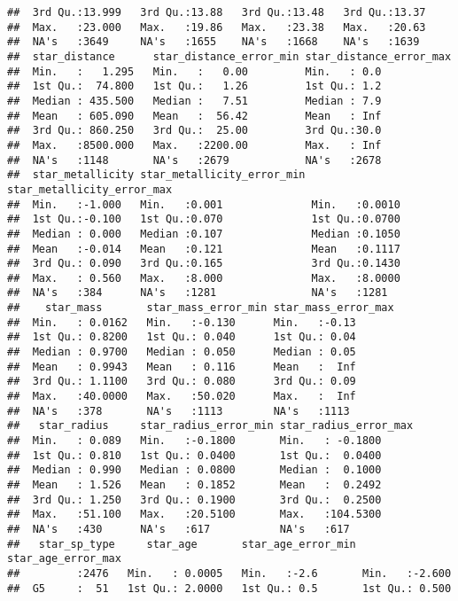 \documentclass[]{article}
\begin{document}
\begin{verbatim}
##  3rd Qu.:13.999   3rd Qu.:13.88   3rd Qu.:13.48   3rd Qu.:13.37  
##  Max.   :23.000   Max.   :19.86   Max.   :23.38   Max.   :20.63  
##  NA's   :3649     NA's   :1655    NA's   :1668    NA's   :1639   
##  star_distance      star_distance_error_min star_distance_error_max
##  Min.   :   1.295   Min.   :   0.00         Min.   : 0.0           
##  1st Qu.:  74.800   1st Qu.:   1.26         1st Qu.: 1.2           
##  Median : 435.500   Median :   7.51         Median : 7.9           
##  Mean   : 605.090   Mean   :  56.42         Mean   : Inf           
##  3rd Qu.: 860.250   3rd Qu.:  25.00         3rd Qu.:30.0           
##  Max.   :8500.000   Max.   :2200.00         Max.   : Inf           
##  NA's   :1148       NA's   :2679            NA's   :2678           
##  star_metallicity star_metallicity_error_min star_metallicity_error_max
##  Min.   :-1.000   Min.   :0.001              Min.   :0.0010            
##  1st Qu.:-0.100   1st Qu.:0.070              1st Qu.:0.0700            
##  Median : 0.000   Median :0.107              Median :0.1050            
##  Mean   :-0.014   Mean   :0.121              Mean   :0.1117            
##  3rd Qu.: 0.090   3rd Qu.:0.165              3rd Qu.:0.1430            
##  Max.   : 0.560   Max.   :8.000              Max.   :8.0000            
##  NA's   :384      NA's   :1281               NA's   :1281              
##    star_mass       star_mass_error_min star_mass_error_max
##  Min.   : 0.0162   Min.   :-0.130      Min.   :-0.13      
##  1st Qu.: 0.8200   1st Qu.: 0.040      1st Qu.: 0.04      
##  Median : 0.9700   Median : 0.050      Median : 0.05      
##  Mean   : 0.9943   Mean   : 0.116      Mean   :  Inf      
##  3rd Qu.: 1.1100   3rd Qu.: 0.080      3rd Qu.: 0.09      
##  Max.   :40.0000   Max.   :50.020      Max.   :  Inf      
##  NA's   :378       NA's   :1113        NA's   :1113       
##   star_radius     star_radius_error_min star_radius_error_max
##  Min.   : 0.089   Min.   :-0.1800       Min.   : -0.1800     
##  1st Qu.: 0.810   1st Qu.: 0.0400       1st Qu.:  0.0400     
##  Median : 0.990   Median : 0.0800       Median :  0.1000     
##  Mean   : 1.526   Mean   : 0.1852       Mean   :  0.2492     
##  3rd Qu.: 1.250   3rd Qu.: 0.1900       3rd Qu.:  0.2500     
##  Max.   :51.100   Max.   :20.5100       Max.   :104.5300     
##  NA's   :430      NA's   :617           NA's   :617          
##   star_sp_type     star_age       star_age_error_min star_age_error_max
##         :2476   Min.   : 0.0005   Min.   :-2.6       Min.   :-2.600    
##  G5     :  51   1st Qu.: 2.0000   1st Qu.: 0.5       1st Qu.: 0.500    

\end{verbatim}
\end{document}

